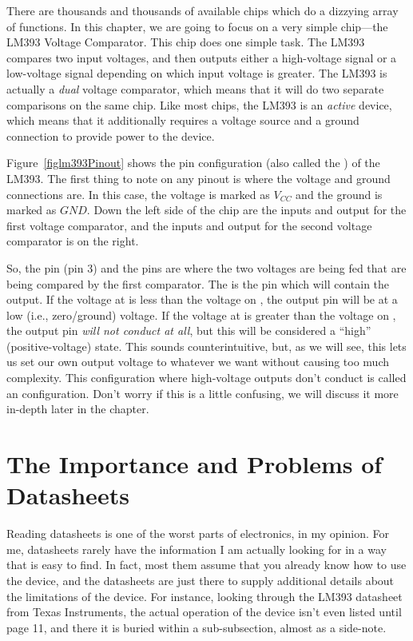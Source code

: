 There are thousands and thousands of available chips which do a dizzying array of functions.
In this chapter, we are going to focus on a very simple chip---the LM393 Voltage Comparator.
This chip does one simple task.
The LM393 compares two input voltages, and then outputs either a high-voltage signal or a low-voltage signal depending on which input voltage is greater.
The LM393 is actually a \emph{dual} voltage comparator, which means that it will do two separate comparisons on the same chip.
Like most chips, the LM393 is an \emph{active} device, which means that it additionally requires a voltage source and a ground connection to provide power to the device.


Figure~\ref{figlm393Pinout} shows the pin configuration (also called the ) of the LM393.
The first thing to note on any pinout is where the voltage and ground connections are.
In this case, the voltage is marked as $V_{CC}$ and the ground is marked as $GND$.
Down the left side of the chip are the inputs and output for the first voltage comparator, and the inputs and output for the second voltage comparator is on the right.

So, the  pin (pin 3) and the  pins are where the two voltages are being fed that are being compared by the first comparator.
The  is the pin which will contain the output.
If the voltage at  is less than the voltage on , the output pin will be at a low (i.e., zero/ground) voltage.
If the voltage at  is greater than the voltage on , the output pin \emph{will not conduct at all}, but this will be considered a ``high'' (positive-voltage) state.
This sounds counterintuitive, but, as we will see, this lets us set our own output voltage to whatever we want without causing too much complexity.
This configuration where high-voltage outputs don't conduct is called an  configuration.
Don't worry if this is a little confusing, we will discuss it more in-depth later in the chapter.

\section{The Importance and Problems of Datasheets}

Reading datasheets is one of the worst parts of electronics, in my opinion. 
For me, datasheets rarely have the information I am actually looking for in a way that is easy to find.
In fact, most them assume that you already know how to use the device, and the datasheets are just there to supply additional details about the limitations of the device.
For instance, looking through the LM393 datasheet from Texas Instruments, the actual operation of the device isn't even listed until page 11, and there it is buried within a sub-subsection, almost as a side-note.

